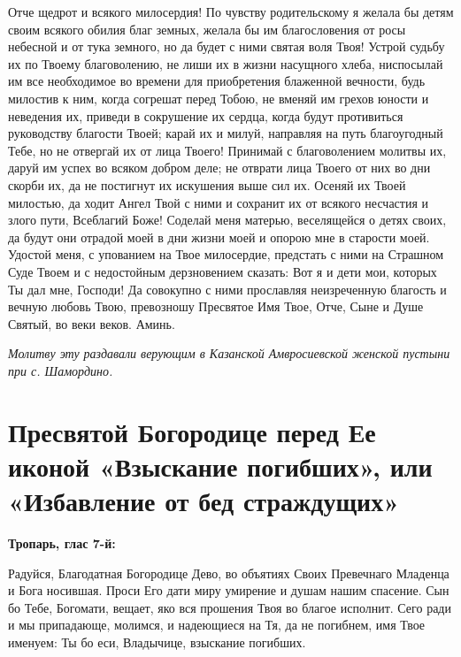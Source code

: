 Отче щедрот и всякого милосердия! По чувству родительскому я желала бы детям своим всякого обилия благ земных, желала бы им благословения от росы небесной и от тука земного, но да будет с ними святая воля Твоя! Устрой судьбу их по Твоему благоволению, не лиши их в жизни насущного хлеба, ниспосылай им все необходимое во времени для приобретения блаженной вечности, будь милостив к ним, когда согрешат перед Тобою, не вменяй им грехов юности и неведения их, приведи в сокрушение их сердца, когда будут противиться руководству благости Твоей; карай их и милуй, направляя на путь благоугодный Тебе, но не отвергай их от лица Твоего! Принимай с благоволением молитвы их, даруй им успех во всяком добром деле; не отврати лица Твоего от них во дни скорби их, да не постигнут их искушения выше сил их. Осеняй их Твоей милостью, да ходит Ангел Твой с ними и сохранит их от всякого несчастия и злого пути, Всеблагий Боже! Соделай меня матерью, веселящейся о детях своих, да будут они отрадой моей в дни жизни моей и опорою мне в старости моей. Удостой меня, с упованием на Твое милосердие, предстать с ними на Страшном Суде Твоем и с недостойным дерзновением сказать: Вот я и дети мои, которых Ты дал мне, Господи! Да совокупно с ними прославляя неизреченную благость и вечную любовь Твою, превозношу Пресвятое Имя Твое, Отче, Сыне и Душе Святый, во веки веков. Аминь.

\itshape Молитву эту раздавали верующим в Казанской Амвросиевской женской пустыни при с. Шамордино.

\normalfont{}





\newpage\section{Пресвятой Богородице перед Ее иконой «Взыскание погибших», или «Избавление от бед страждущих»}
 
\bfseries Тропарь, глас 7-й:\normalfont{}


Радуйся, Благодатная Богородице Дево, во объятиях Своих Превечнаго Младенца и Бога носившая. Проси Его дати миру умирение и душам нашим спасение. Сын бо Тебе, Богомати, вещает, яко вся прошения Твоя во благое исполнит. Сего ради и мы припадающе, молимся, и надеющиеся на Тя, да не погибнем, имя Твое именуем: Ты бо еси, Владычице, взыскание погибших.




